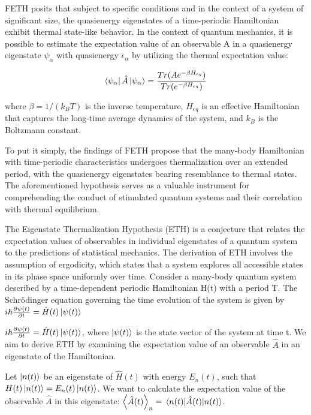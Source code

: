 \documentclass[%
reprint,
superscriptaddress,
amsmath,amssymb,
aps,
prb,
]{revtex4-2}
\begin{document}
FETH posits that subject to specific conditions and in the context of a system of significant size, the quasienergy eigenstates of a time-periodic Hamiltonian exhibit thermal state-like behavior. In the context of quantum mechanics, it is possible to estimate the expectation value of an observable A in a quasienergy eigenstate $\psi_\alpha$ with quasienergy $\epsilon_\alpha$ by utilizing the thermal expectation value:

\begin{equation}
\bra{\psi_\alpha}\hat{A}\ket{\psi_\alpha} = \frac{Tr (Ae^{-\beta H_{eq}})}{Tr(e^{-\beta H_{eq}})}
\end{equation}
 
where $\beta = 1/(k_B T)$ is the inverse temperature, $H_{eq}$ is an effective Hamiltonian that captures the long-time average dynamics of the system, and $k_B$ is the Boltzmann constant.

To put it simply, the findings of FETH propose that the many-body Hamiltonian with time-periodic characteristics undergoes thermalization over an extended period, with the quasienergy eigenstates bearing resemblance to thermal states. The aforementioned hypothesis serves as a valuable instrument for comprehending the conduct of stimulated quantum systems and their correlation with thermal equilibrium.


The Eigenstate Thermalization Hypothesis (ETH) is a conjecture that relates the expectation values of observables in individual eigenstates of a quantum system to the predictions of statistical mechanics. The derivation of ETH involves the assumption of ergodicity, which states that a system explores all accessible states in its phase space uniformly over time.
Consider a many-body quantum system described by a time-dependent periodic Hamiltonian H(t) with a period T. The Schrödinger equation governing the time evolution of the system is given by $i\hbar \pdv{\psi(t)}{t} = \hat{H}(t) \ket{\psi(t)}$

$i\hbar \pdv{\psi(t)}{t} = \hat{H}(t) \ket{\psi(t)}$, where $\ket{\psi(t)}$ is the state vector of the system at time t. We aim to derive ETH by examining the expectation value of an observable $\hat{A}$ in an eigenstate of the Hamiltonian.

Let $\ket{n(t)}$ be an eigenstate of $\hat{H}(t)$ with energy $E_n (t)$, such that $H(t)\ket{n(t)} = E_n (t)\ket{n(t)}$. We want to calculate the expectation value of the observable $\hat{A}$ in this eigenstate: $\expval{\hat{A}(t)}_n = \expval{\hat{A}(t)}{{n(t)}}$.
\end{document}
